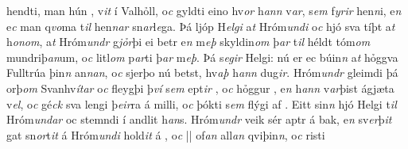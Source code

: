 hendti, man hún  ,   v\textit{it}   í Valhỏll, o\textit{c} gyldti eino hv\textit{or} h\textit{ann}
v\textit{ar}, s\textit{em}  f\textit{yrir} hen\textit{n}i, e\textit{n} e\textit{c} man q\textit{vo}ma
t\textit{il} hen\textit{n}\textit{ar} sn\textit{ar}l\textit{e}ga. Þá ljóp
H\textit{elgi} a\textit{t} Hróm\textit{undi} o\textit{c} hjó sva tíþt a\textit{t}
h\textit{onom}, a\textit{t} Hróm\textit{undr} g\textit{jỏr}þi ei betr
e\textit{n}  
m\textit{eþ} skyldin\textit{om} þ\textit{ar} t\textit{il}  héldt   tóm\textit{om} mundriþ\textit{an}um, o\textit{c} litl\textit{om} p\textit{ar}ti þ\textit{ar} m\textit{eþ}. 
Þá s\textit{egir} Helgi: nú er ec 
búin\textit{n} a\textit{t} hỏggva Fulltrúa þin\textit{n}  an\textit{n}\textit{an}, o\textit{c} sjerþo nú  betst,
hv\textit{aþ} h\textit{ann} dug\textit{ir}. Hróm\textit{undr} gleimdi þá
orþ\textit{om} Svanhv\textit{ítar} o\textit{c} fleygþi   þ\textit{ví} s\textit{em}  ept\textit{ir} , o\textit{c} hỏggur  , e\textit{n} h\textit{ann} v\textit{ar}þist ágjæta v\textit{el},
o\textit{c} gé\textit{ck} sva lengi þ\textit{eir}ra á milli, o\textit{c} þókti   s\textit{em}  flýgi af  . 
Eitt sin\textit{n} hjó Helgi t\textit{il} Hróm\textit{undar} oc  stemndi í andlit h\textit{an}s. Hróm\textit{undr} veik sér    aptr á bak,  e\textit{n} sv\textit{er}þ\textit{it} gat
sn\textit{or}t\textit{it} á Hróm\textit{undi} hold\textit{it} á  , o\textit{c}  ||  of\textit{an} all\textit{an} qviþin\textit{n}, o\textit{c} risti
